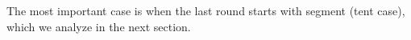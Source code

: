 \documentclass[reqno]{amsart}
\theoremstyle{definition} \newtheorem{definition}{Definition}[section]
\theoremstyle{definition} \newtheorem{remark}[definition]{Remark}
\theoremstyle{plain} \newtheorem{lemma}[definition]{Lemma}
\theoremstyle{plain} \newtheorem{proposition}[definition]{Proposition}
\theoremstyle{plain} \newtheorem{theorem}[definition]{Theorem}
\theoremstyle{plain} \newtheorem{corollary}[definition]{Corollary}
\theoremstyle{definition} \newtheorem{example}[definition]{Example}
\theoremstyle{plain} \newtheorem{claim}[clai]{Claim}
\theoremstyle{definition} \newtheorem{assumption}[definition]{Assumption}
\theoremstyle{definition} \newtheorem{observation}[definition]{Observation}
\newcommand{\1}{\mathbbm 1}
\numberwithin{equation}{section} %
\theoremstyle{plain} \newtheorem*{theorem*}{Theorem}
\theoremstyle{plain} \newtheorem{mthm}[maintheorem]{Main Theorem}
\theoremstyle{plain} \newtheorem*{mthm*}{Main Theorem}
\theoremstyle{plain} \newtheorem*{conjecture*}{Conjecture}
\theoremstyle{plain} \newtheorem{conjecture}[definition]{Conjecture}
\theoremstyle{plain} \newtheorem*{problem*}{Problem}
\begin{document}
The most important case is when the last round starts with segment (tent case), which we analyze in the next section.

%
%
%
%
%
%
%  
%
%
%
%
%
\end{document}
